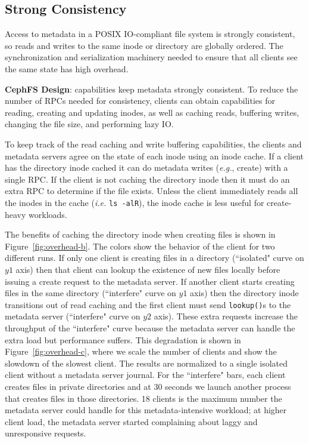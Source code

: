 \subsection{Strong Consistency}
\label{sec:strong-consistency}

Access to metadata in a POSIX IO-compliant file system is strongly consistent, so
reads and writes to the same inode or directory are globally ordered.  The
synchronization and serialization machinery needed to ensure that all clients
see the same state has high overhead.

\textbf{CephFS Design}: capabilities keep metadata strongly
consistent. To reduce the number of RPCs needed for consistency, clients can
obtain capabilities for reading, creating and updating inodes, as well as caching reads,
buffering writes, changing the file size, and performing lazy IO.

To keep track of the read caching and write buffering capabilities, the clients
and metadata servers agree on the state of each inode using an inode cache.  If
a client has the directory inode cached it can do metadata writes ({\it e.g.},
create) with a single RPC. If the client is not caching the directory inode
then it must do an extra RPC to determine if the file exists.  Unless the
client immediately reads all the inodes in the cache ({\it i.e.} \texttt{ls
-alR}), the inode cache is less useful for create-heavy workloads.

The benefits of caching the directory inode when creating files is shown in
Figure~\ref{fig:overhead-b}. The colors show the behavior of the client for two
different runs.  If only one client is creating files in a directory
(``isolated" curve on \(y1\) axis) then that client can lookup the existence of
new files locally before issuing a create request to the metadata server. If
another client starts creating files in the same directory (``interfere" curve
on \(y1\) axis) then the directory inode transitions out of read caching and
the first client must send \texttt{lookup()}s to the metadata server
(``interfere" curve on \(y2\) axis). These extra requests increase the
throughput of the ``interfere" curve because the metadata server can handle the
extra load but performance suffers.  This degradation is shown in
Figure~\ref{fig:overhead-c}, where we scale the number of clients and show the
slowdown of the slowest client.  The results are normalized to a single
isolated client without a metadata server journal.  For the ``interfere" bars,
each client creates files in private directories and at 30 seconds we launch
another process that creates files in those directories. 18 clients is the
maximum number the metadata server could handle for this metadata-intensive
workload; at higher client load, the metadata server started complaining about
laggy and unresponsive requests.

